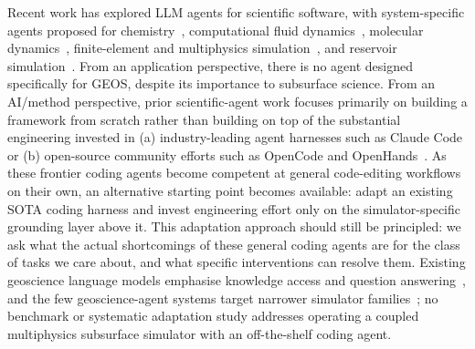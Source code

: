 \documentclass{article}
\begin{document}
Recent work has explored LLM agents for scientific software, with system-specific agents proposed for chemistry~\citep{bran2024chemcrow,boiko2023coscientist}, computational fluid dynamics~\citep{chen2024metaopenfoam,yue2025foamagent,pandey2025openfoamgpt}, molecular dynamics~\citep{shi2026mdagent2,zhao2026polyjarvis,guilbert2025dynamate}, finite-element and multiphysics simulation~\citep{zhan2025mooseagent,mcpsim2026,ni2024mechagents}, and reservoir simulation~\citep{moyner2026jutulgpt}. From an application perspective, there is no agent designed specifically for GEOS, despite its importance to subsurface science. From an AI/method perspective, prior scientific-agent work focuses primarily on building a framework from scratch rather than building on top of the substantial engineering invested in (a) industry-leading agent harnesses such as Claude Code or (b) open-source community efforts such as OpenCode and OpenHands~\citep{wang2024openhands}. As these frontier coding agents become competent at general code-editing workflows on their own, an alternative starting point becomes available: adapt an existing SOTA coding harness and invest engineering effort only on the simulator-specific grounding layer above it. This adaptation approach should still be principled: we ask what the actual shortcomings of these general coding agents are for the class of tasks we care about, and what specific interventions can resolve them. Existing geoscience language models emphasise knowledge access and question answering~\citep{deng2023k2,lin2024geogalactica}, and the few geoscience-agent systems target narrower simulator families~\citep{bekele2025geosim,li2025seismologyagent,moyner2026jutulgpt}; no benchmark or systematic adaptation study addresses operating a coupled multiphysics subsurface simulator with an off-the-shelf coding agent.
\end{document}
